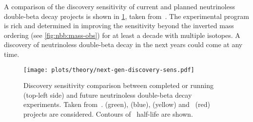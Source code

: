 A comparison of the discovery sensitivity of current and planned neutrinoless double-beta
decay projects is shown in \cref{fig:nbb:next-gen-disc-sens}, taken
from~\cite{Detwiler2020}. The experimental program is rich and determined in improving the
sensitivity beyond the inverted mass ordering (see \cref{fig:nbb:mass-obs}) for at least a
decade with multiple isotopes. A discovery of neutrinoless double-beta decay in the next
years could come at any time.

\begin{figure}
  \centering
  \texttt{[image: plots/theory/next-gen-discovery-sens.pdf]}
  \caption{%
    Discovery sensitivity comparison between completed or running (top-left side) and
    future neutrinoless double-beta decay experiments. Taken from~\cite{Detwiler2020}.
     (green),  (blue),  (yellow) and \gesix\ (red)
    projects are considered. Contours of \onbb\ half-life are shown.
  }\label{fig:nbb:next-gen-disc-sens}
\end{figure}

\chapendgliph{}


